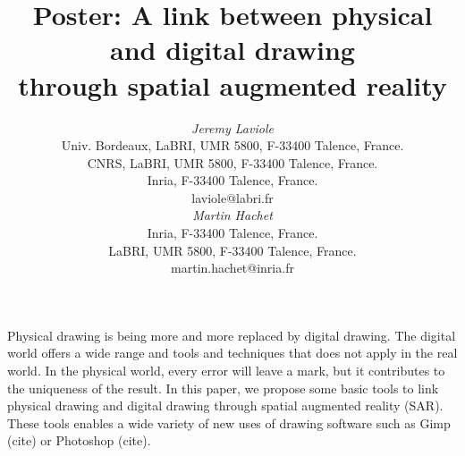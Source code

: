 \documentclass{article}
\begin{document}




\title{Poster: A link between physical and digital drawing \\
       through spatial augmented reality}


\author{
\parbox[t]{9cm}{\centering
	     {\em Jeremy Laviole}\\
	     Univ. Bordeaux, LaBRI, UMR 5800, F-33400 Talence, France.\\
         CNRS, LaBRI, UMR 5800, F-33400 Talence, France.\\
	     Inria, F-33400 Talence, France.\\
	     laviole@labri.fr}
	     
\parbox[t]{9cm}{\centering
	     {\em Martin Hachet}\\
	     Inria, F-33400 Talence, France.\\
	     LaBRI, UMR 5800, F-33400 Talence, France.\\
	     martin.hachet@inria.fr}
}



\maketitle

\abstract

Physical drawing is being more and more replaced by digital drawing. The digital world offers a wide range and tools and techniques that does not apply in the real world. In the physical world, every error will leave a mark, but it contributes to the uniqueness of the result. In this paper, we propose some basic tools to link physical drawing and digital drawing through spatial augmented reality (SAR). These tools enables a wide variety of new uses of drawing software such as Gimp (cite) or Photoshop (cite). 
\end{document}
